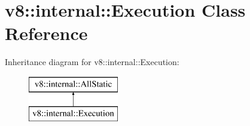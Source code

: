 \hypertarget{classv8_1_1internal_1_1_execution}{}\section{v8\+:\+:internal\+:\+:Execution Class Reference}
\label{classv8_1_1internal_1_1_execution}
Inheritance diagram for v8\+:\+:internal\+:\+:Execution\+:\begin{figure}[H]
\begin{center}
\leavevmode
\includegraphics[height=2.000000cm]{classv8_1_1internal_1_1_execution}
\end{center}
\end{figure}
